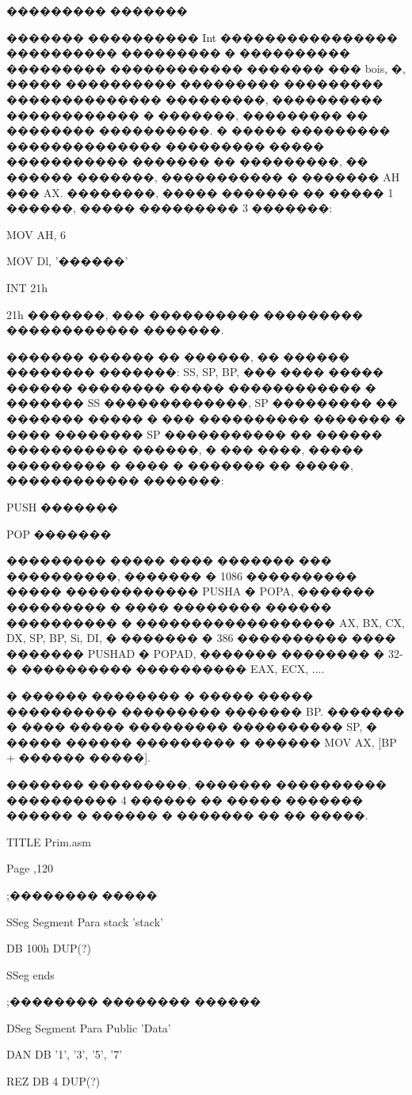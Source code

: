 ��������� �������

������� ���������� Int ���������������� ���������� ��������� � ���������� ��������� ������������
������� ��� bois, �, ����� ���������� ��������� ��������� �������������� ���������, ����������
������������ � �������, ��������� �� �������� ����������. � ����� ��������� ��������������
��������� ����� ����������� ������� �� ���������, �� ������ �������, ����������� � ������� AH
��� AX. ��������, ����� ������� �� ����� 1 ������, ����� ��������� 3 �������:

MOV AH, 6

MOV Dl, '������'

INT 21h 

21h �������, ��� ���������� ��������� ������������ �������.

������� ������ �� ������, �� ������ �������� �������: SS, SP, BP, ��� ����
����� ������ �������� ����� ������������ � ������� SS �������������, SP ��������� �� �������
����� � ��� ���������� ������� � ���� �������� SP ����������� �� ������ ����������� ������, �
��� ����, ����� ��������� � ���� � ������� �� �����, ������������ �������:

PUSH �������

POP �������

��������� ����� ���� ������� ��� ����������, ������� � 1086 ���������� ����� ������������
PUSHA � POPA, ������� ��������� � ���� �������� ������ ���������� � ������������������
AX, BX, CX, DX, SP, BP, Si, DI, � ������� � 386 ���������� ���� ������� PUSHAD � POPAD, �������
�������� � 32-� ���������� ���������� EAX, ECX, ....

� ������ �������� � ����� ����� ���������� ��������� ������� BP. ������� � ���� ����� ���������
���������� SP, � ����� ������ ��������� � ������ MOV AX, [BP + ������ �����].

������� ���������, ������� ���������� ���������� 4 ������ �� ����� ������� ������ � ������ � 
������� �� �� �����.

TITLE Prim.asm 

Page ,120

;�������� �����

SSeg Segment Para stack 'stack'

DB 100h DUP(?)

SSeg ends

;�������� �������� ������

DSeg Segment Para Public 'Data'

DAN DB '1', '3', '5', '7'

REZ DB 4 DUP(?)

